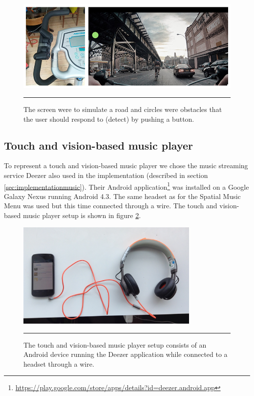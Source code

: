 \begin{figure}[h]
	\centering
		\includegraphics[width=\textwidth,height=\textheight,keepaspectratio]{./Figures/simulation_system.jpg}
		\rule{35em}{1pt}
	\caption[Simulation screen]{The screen were to simulate a road and circles were obstacles that the user should respond to (detect) by pushing a button.}
	\label{fig:simulationsystem}
\end{figure}

\subsection{Touch and vision-based music player}
To represent a touch and vision-based music player we chose the music streaming service Deezer also used in the implementation (described in section \ref{sec:implementationmusic}). Their Android application\footnote{\url{https://play.google.com/store/apps/details?id=deezer.android.app}} was installed on a Google Galaxy Nexus running Android 4.3. The same headset as for the Spatial Music Menu was used but this time connected through a wire. The touch and vision-based music player setup is shown in figure \ref{fig:touchandvisionsystem}.

\begin{figure}[h]
	\centering
		\includegraphics[width=0.8\textwidth,height=\textheight,keepaspectratio]{./Figures/evaluation_visionplayer.jpg}
		\rule{35em}{1pt}
	\caption[Touch and vision-based system]{The touch and vision-based music player setup consists of an Android device running the Deezer application while connected to a headset through a wire.}
	\label{fig:touchandvisionsystem}
\end{figure}

